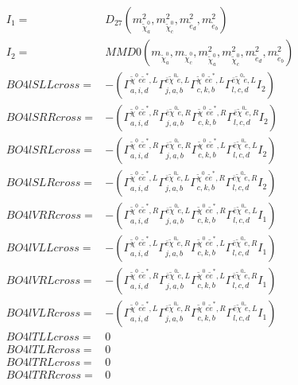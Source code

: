 \documentclass[A4,landscape]{article}
\begin{document}
\begin{align} 
I_1 = & D_{27}(m^2_{\tilde{\chi}^0_{{a}}}, m^2_{\tilde{\chi}^0_{{c}}}, m^2_{\tilde{e}_{{d}}}, m^2_{\tilde{e}_{{b}}}) \\ 
I_2 = & MMD0(m_{\tilde{\chi}^0_{{a}}}, m_{\tilde{\chi}^0_{{c}}}, m^2_{\tilde{\chi}^0_{{a}}}, m^2_{\tilde{\chi}^0_{{c}}}, m^2_{\tilde{e}_{{d}}}, m^2_{\tilde{e}_{{b}}}) \\ 
  BO4lSLLcross= & -( \Gamma^{\tilde{\chi}^0 e \tilde{e}^*,L}_{a, i, d} \Gamma^{\bar{e}\tilde{\chi}^0 \tilde{e} ,L}_{j, a, b} \Gamma^{\tilde{\chi}^0 e \tilde{e}^*,L}_{c, k, b} \Gamma^{\bar{e}\tilde{\chi}^0 \tilde{e} ,L}_{l, c, d} I_2) \\ 
  BO4lSRRcross= & -( \Gamma^{\tilde{\chi}^0 e \tilde{e}^*,R}_{a, i, d} \Gamma^{\bar{e}\tilde{\chi}^0 \tilde{e} ,R}_{j, a, b} \Gamma^{\tilde{\chi}^0 e \tilde{e}^*,R}_{c, k, b} \Gamma^{\bar{e}\tilde{\chi}^0 \tilde{e} ,R}_{l, c, d} I_2) \\ 
  BO4lSRLcross= & -( \Gamma^{\tilde{\chi}^0 e \tilde{e}^*,R}_{a, i, d} \Gamma^{\bar{e}\tilde{\chi}^0 \tilde{e} ,R}_{j, a, b} \Gamma^{\tilde{\chi}^0 e \tilde{e}^*,L}_{c, k, b} \Gamma^{\bar{e}\tilde{\chi}^0 \tilde{e} ,L}_{l, c, d} I_2) \\ 
  BO4lSLRcross= & -( \Gamma^{\tilde{\chi}^0 e \tilde{e}^*,L}_{a, i, d} \Gamma^{\bar{e}\tilde{\chi}^0 \tilde{e} ,L}_{j, a, b} \Gamma^{\tilde{\chi}^0 e \tilde{e}^*,R}_{c, k, b} \Gamma^{\bar{e}\tilde{\chi}^0 \tilde{e} ,R}_{l, c, d} I_2) \\ 
  BO4lVRRcross= & -( \Gamma^{\tilde{\chi}^0 e \tilde{e}^*,R}_{a, i, d} \Gamma^{\bar{e}\tilde{\chi}^0 \tilde{e} ,L}_{j, a, b} \Gamma^{\tilde{\chi}^0 e \tilde{e}^*,R}_{c, k, b} \Gamma^{\bar{e}\tilde{\chi}^0 \tilde{e} ,L}_{l, c, d} I_1) \\ 
  BO4lVLLcross= & -( \Gamma^{\tilde{\chi}^0 e \tilde{e}^*,L}_{a, i, d} \Gamma^{\bar{e}\tilde{\chi}^0 \tilde{e} ,R}_{j, a, b} \Gamma^{\tilde{\chi}^0 e \tilde{e}^*,L}_{c, k, b} \Gamma^{\bar{e}\tilde{\chi}^0 \tilde{e} ,R}_{l, c, d} I_1) \\ 
  BO4lVRLcross= & -( \Gamma^{\tilde{\chi}^0 e \tilde{e}^*,R}_{a, i, d} \Gamma^{\bar{e}\tilde{\chi}^0 \tilde{e} ,L}_{j, a, b} \Gamma^{\tilde{\chi}^0 e \tilde{e}^*,L}_{c, k, b} \Gamma^{\bar{e}\tilde{\chi}^0 \tilde{e} ,R}_{l, c, d} I_1) \\ 
  BO4lVLRcross= & -( \Gamma^{\tilde{\chi}^0 e \tilde{e}^*,L}_{a, i, d} \Gamma^{\bar{e}\tilde{\chi}^0 \tilde{e} ,R}_{j, a, b} \Gamma^{\tilde{\chi}^0 e \tilde{e}^*,R}_{c, k, b} \Gamma^{\bar{e}\tilde{\chi}^0 \tilde{e} ,L}_{l, c, d} I_1) \\ 
  BO4lTLLcross= & 0 \\ 
  BO4lTLRcross= & 0 \\ 
  BO4lTRLcross= & 0 \\ 
  BO4lTRRcross= & 0 \\ 
\end{align} 
\end{document}
